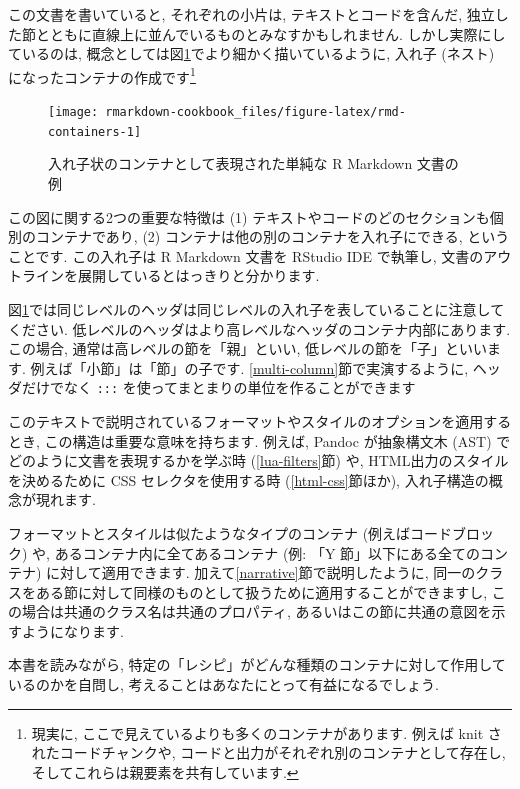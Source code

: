 \documentclass[
  11pt,
]{bxjsreport}
\begin{document}
この文書を書いていると, それぞれの小片は, テキストとコードを含んだ, 独立した節とともに直線上に並んでいるものとみなすかもしれません. しかし実際にしているのは, 概念としては図\ref{fig:rmd-containers}でより細かく描いているように, 入れ子 (ネスト) になったコンテナの作成です\footnote{現実に, ここで見えているよりも多くのコンテナがあります. 例えば knit されたコードチャンクや, コードと出力がそれぞれ別のコンテナとして存在し, そしてこれらは親要素を共有しています.}

\begin{figure}

{\centering \texttt{[image: rmarkdown-cookbook\_files/figure-latex/rmd-containers-1]} 

}

\caption{入れ子状のコンテナとして表現された単純な R Markdown 文書の例}\label{fig:rmd-containers}
\end{figure}

この図に関する2つの重要な特徴は (1) テキストやコードのどのセクションも個別のコンテナであり, (2) コンテナは他の別のコンテナを入れ子にできる, ということです. この入れ子は R Markdown 文書を RStudio IDE で執筆し, 文書のアウトラインを展開しているとはっきりと分かります.

図\ref{fig:rmd-containers}では同じレベルのヘッダは同じレベルの入れ子を表していることに注意してください. 低レベルのヘッダはより高レベルなヘッダのコンテナ内部にあります. この場合, 通常は高レベルの節を「親」といい, 低レベルの節を「子」といいます. 例えば「小節」は「節」の子です. \ref{multi-column}節で実演するように, ヘッダだけでなく \texttt{:::} を使ってまとまりの単位を作ることができます

このテキストで説明されているフォーマットやスタイルのオプションを適用するとき, この構造は重要な意味を持ちます. 例えば, Pandoc が抽象構文木 (AST) でどのように文書を表現するかを学ぶ時 (\ref{lua-filters}節) や, HTML出力のスタイルを決めるために CSS セレクタを使用する時 (\ref{html-css}節ほか), 入れ子構造の概念が現れます.

フォーマットとスタイルは似たようなタイプのコンテナ (例えばコードブロック) や, あるコンテナ内に全てあるコンテナ (例: 「Y 節」以下にある全てのコンテナ) に対して適用できます. 加えて\ref{narrative}節で説明したように, 同一のクラスをある節に対して同様のものとして扱うために適用することができますし, この場合は共通のクラス名は共通のプロパティ, あるいはこの節に共通の意図を示すようになります.

本書を読みながら, 特定の「レシピ」がどんな種類のコンテナに対して作用しているのかを自問し, 考えることはあなたにとって有益になるでしょう.
\end{document}

